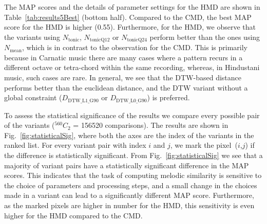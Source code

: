 The MAP scores and the details of parameter settings for the HMD are shown in Table~\ref{tab:results5Best} (bottom half). Compared to the CMD, the best MAP score for the HMD is higher (0.55).    Furthermore, for the HMD, we observe that the variants using $N_{\mathrm{tonic}}$, $N_{\mathrm{tonicQ12}}$ or $N_{\mathrm{tonicQ24}}$ perform better than the ones using $N_{\mathrm{mean}}$, which is in contrast to the observation for the CMD. This is primarily because in Carnatic music there are many cases where a pattern recurs in a different octave or tetra-chord within the same recording, whereas, in Hindustani music, such cases are rare. In general, we see that the DTW-based distance performs better than the euclidean distance, and the DTW variant without a global constraint ($D_{\mathrm{DTW\_L1\_G90}}$ or $D_{\mathrm{DTW\_L0\_G90}}$) is preferred. 




To assess the statistical significance of the results we compare every possible pair of the variants ($^{560}C_{2}$ = 156520 comparisons). The results are shown in Fig.~\ref{fig:statisticalSig}, where both the axes are the index of the variants in the ranked list. For every variant pair with index $i$ and $j$, we mark the pixel~($i$,$j$) if the difference is statistically significant. From Fig.~\ref{fig:statisticalSig} we see that a majority of variant pairs have a statistically significant difference in the MAP scores. This indicates that the task of computing melodic similarity is sensitive to the choice of parameters and processing steps, and a small change in the choices made in a variant can lead to a significantly different MAP score. Furthermore, as the marked pixels are higher in number for the HMD, this sensitivity is even higher for the HMD compared to the CMD.




